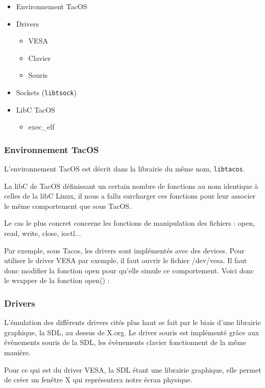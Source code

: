 \begin{itemize}
  \item Environnement TacOS
  \item Drivers
  \begin{itemize}
    \item VESA
    \item Clavier
    \item Souris 
  \end{itemize}
  \item Sockets (\verb|libtsock|)
  \item LibC TacOS
  \begin{itemize}
    \item exec\_elf
  \end{itemize}
\end{itemize}

\subsubsection{Environnement TacOS}

L'environnement TacOS est décrit dans la librairie du même nom, \verb|libtacos|.

La libC de TacOS définissant un certain nombre de fonctions au nom identique à celles de la libC Linux, il nous a fallu surcharger ces fonctions pour leur associer le même comportement que sous TacOS.

Le cas le plus concret concerne les fonctions de manipulation des fichiers : open, read, write, close, ioctl...

Par exemple, sous Tacos, les drivers sont implémentés avec des devices.
Pour utiliser le driver VESA par exemple, il faut ouvrir le fichier /dev/vesa.
Il faut donc modifier la fonction open pour qu'elle simule ce comportement.
Voici donc le wrapper de la fonction open() :



\subsubsection{Drivers}

L'émulation des différents drivers cités plus haut se fait par le biais d'une librairie graphique, la SDL, au dessus de X.org.
Le driver souris est implémenté grâce aux évènements souris de la SDL, les évènements clavier fonctionnent de la même manière.

Pour ce qui est du driver VESA, la SDL étant une librairie graphique, elle permet de créer un fenêtre X qui représentera notre écran physique. 

